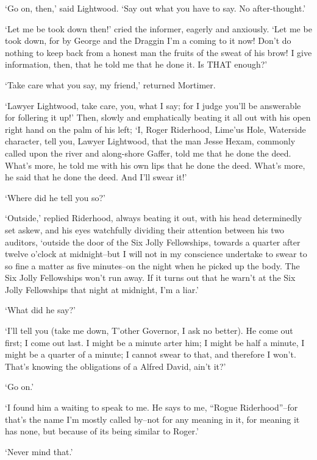 ‘Go on, then,’ said Lightwood. ‘Say out what you have to say. No
after-thought.’

‘Let me be took down then!’ cried the informer, eagerly and anxiously.
‘Let me be took down, for by George and the Draggin I’m a coming to it
now! Don’t do nothing to keep back from a honest man the fruits of the
sweat of his brow! I give information, then, that he told me that he
done it. Is THAT enough?’

‘Take care what you say, my friend,’ returned Mortimer.

‘Lawyer Lightwood, take care, you, what I say; for I judge you’ll be
answerable for follering it up!’ Then, slowly and emphatically beating
it all out with his open right hand on the palm of his left; ‘I,
Roger Riderhood, Lime’us Hole, Waterside character, tell you, Lawyer
Lightwood, that the man Jesse Hexam, commonly called upon the river and
along-shore Gaffer, told me that he done the deed. What’s more, he told
me with his own lips that he done the deed. What’s more, he said that he
done the deed. And I’ll swear it!’

‘Where did he tell you so?’

‘Outside,’ replied Riderhood, always beating it out, with his head
determinedly set askew, and his eyes watchfully dividing their
attention between his two auditors, ‘outside the door of the Six Jolly
Fellowships, towards a quarter after twelve o’clock at midnight--but I
will not in my conscience undertake to swear to so fine a matter as
five minutes--on the night when he picked up the body. The Six Jolly
Fellowships won’t run away. If it turns out that he warn’t at the Six
Jolly Fellowships that night at midnight, I’m a liar.’

‘What did he say?’

‘I’ll tell you (take me down, T’other Governor, I ask no better). He
come out first; I come out last. I might be a minute arter him; I might
be half a minute, I might be a quarter of a minute; I cannot swear to
that, and therefore I won’t. That’s knowing the obligations of a Alfred
David, ain’t it?’

‘Go on.’

‘I found him a waiting to speak to me. He says to me, “Rogue
Riderhood”--for that’s the name I’m mostly called by--not for any
meaning in it, for meaning it has none, but because of its being similar
to Roger.’

‘Never mind that.’

